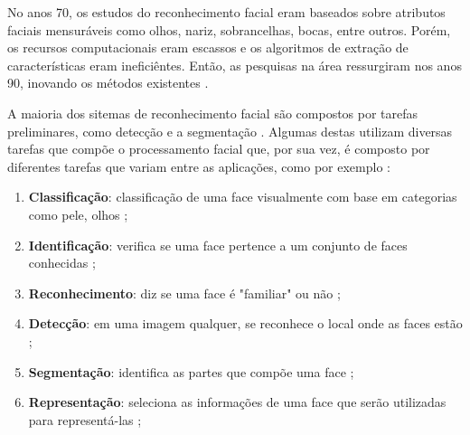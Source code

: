 No anos 70, os estudos do reconhecimento facial eram baseados sobre atributos faciais mensuráveis como olhos, nariz, sobrancelhas, bocas, entre outros. Porém, os recursos computacionais eram escassos e os algoritmos de extração de características eram ineficiêntes. Então, as pesquisas na área ressurgiram nos anos 90, inovando os métodos existentes \cite{Hon98}\cite{saocarlos}.

A maioria dos sitemas de reconhecimento facial são compostos por tarefas preliminares, como detecção e a segmentação \cite{Sun98}. 
Algumas destas utilizam diversas tarefas que compõe o processamento facial que, por sua vez, é composto por diferentes tarefas que variam entre as aplicações, como por exemplo \cite{saocarlos}:
	\begin{enumerate}
		\item \textbf{Classificação}: classificação de uma face visualmente com base em categorias como pele, olhos \cite{Abd95};
		\item \textbf{Identificação}: verifica se uma face pertence a um conjunto de faces conhecidas \cite{Cell99};
		\item \textbf{Reconhecimento}: diz se uma face é "familiar" ou não \cite{Abd95};
		\item \textbf{Detecção}: em uma imagem qualquer, se reconhece o local onde as faces estão \cite{Cell99};
		\item \textbf{Segmentação}: identifica as partes que compõe uma face \cite{Cell99};
		\item \textbf{Representação}: seleciona as informações de uma face que serão utilizadas para representá-las \cite{Cell99};
	\end{enumerate}






